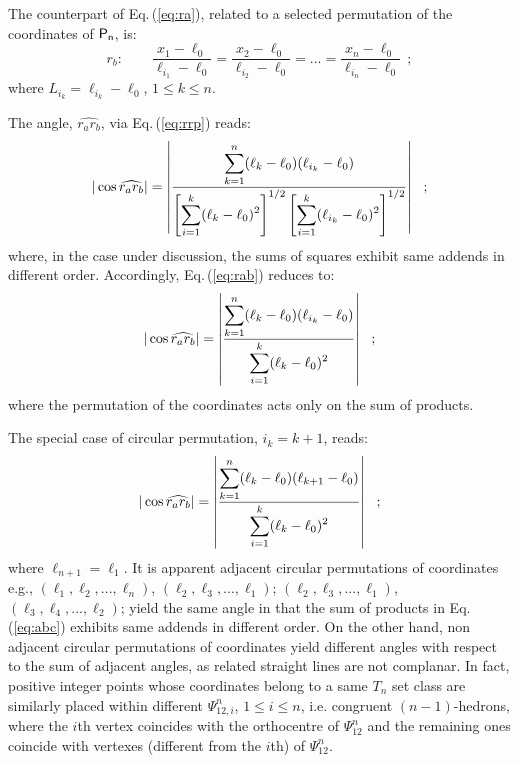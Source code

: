 \documentclass[12pt,a4paper]{article}
\begin{document}
The counterpart of Eq.\,(\ref{eq:ra}), related to a selected permutation of
the coordinates of ${\sf P_n}$, is:
\begin{equation}
\label{eq:rb}
r_b:\qquad\frac{x_1-\ell_0}{\ell_{i_1}-\ell_0}=\frac{x_2-\ell_0}
{\ell_{i_2}-\ell_0}=...=\frac{x_n-\ell_0}{\ell_{i_n}-\ell_0}~~;
\end{equation}
where $L_{i_k}=\ell_{i_k}-\ell_0$, $1\le k\le n$.

The angle, $\widehat{r_ar_b}$, via Eq.\,(\ref{eq:rrp}) reads:
\begin{equation}
\label{eq:rab}
\vert\cos\widehat{r_ar_b}\vert=\left\vert\frac{\displaystyle \sum_{k=1}^n
(\ell_k-\ell_0)(\ell_{i_k}-\ell_0)}{\displaystyle \left[\sum_{i=1}^k(\ell_k-\ell_0)^2\right]^{1/2}
\left[\sum_{i=1}^k(\ell_{i_k}-\ell_0)^2\right]^{1/2}}\right\vert~~;
\end{equation}
where, in the case under discussion, the sums of squares exhibit same
addends in different order.   Accordingly, Eq.\,(\ref{eq:rab}) reduces to:
\begin{equation}
\label{eq:abp}
\vert\cos\widehat{r_ar_b}\vert=\left\vert\frac{\displaystyle \sum_{k=1}^n
(\ell_k-\ell_0)(\ell_{i_k}-\ell_0)}{\displaystyle \sum_{i=1}^k(\ell_k-\ell_0)^2}\right\vert~~;
\end{equation}
where the permutation of the coordinates acts only on the sum of products.

The special case of circular permutation, $i_k=k+1$, reads:
\begin{equation}
\label{eq:abc}
\vert\cos\widehat{r_ar_b}\vert=\left\vert\frac{\displaystyle \sum_{k=1}^n
(\ell_k-\ell_0)(\ell_{k+1}-\ell_0)}{\displaystyle \sum_{i=1}^k(\ell_k-\ell_0)^2}\right\vert~~;
\end{equation}
where $\ell_{n+1}=\ell_1$.   It is apparent adjacent circular permutations of
coordinates e.g., $(\ell_1,\ell_2,...,\ell_n)$, $(\ell_2,\ell_3,...,\ell_1)$;
$(\ell_2,\ell_3,...,\ell_1)$, $(\ell_3,\ell_4,...,\ell_2)$; yield the same
angle in that the sum of products in Eq.\,(\ref{eq:abc}) exhibits same
addends in different order.    On the other hand, non adjacent circular
permutations of coordinates yield different angles with respect to the sum of
adjacent angles, as related straight lines
are not complanar.   In fact, positive integer points whose coordinates belong
to a same $T_n$ set class are similarly placed within different
$\Psi_{12,i}^n$, $1\le i\le n$, i.e. congruent $(n-1)$-hedrons, where the
$i$th vertex coincides with the orthocentre of $\Psi_{12}^n$ and the remaining
ones coincide with vertexes (different from the $i$th) of $\Psi_{12}^n$.
\end{document}
